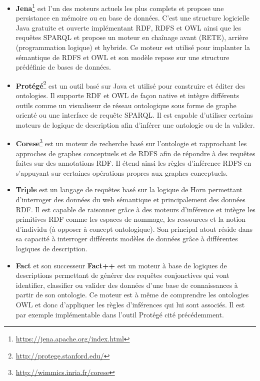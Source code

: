 \begin{itemize}
	\item \textbf{Jena}\footnote{\url{https://jena.apache.org/index.html}} \cite{jena2007semantic} est l’un des moteurs actuels les plus complets et propose une persistance en mémoire ou en base de données. C'est une structure logicielle Java gratuite et ouverte implémentant RDF, RDFS et OWL ainsi que les requêtes SPARQL et propose un moteur en chaînage avant (RETE), arrière (programmation logique) et hybride. Ce moteur est utilisé pour implanter la sémantique de RDFS et OWL et son modèle repose sur une structure prédéfinie de bases de données.
	\item \textbf{Protégé}\footnote{\url{http://protege.stanford.edu/}} \cite{noy2001creating} est un outil basé sur Java et utilisé pour construire et éditer des ontologies. Il supporte RDF et OWL de façon native et intègre différents outils comme un visualiseur de réseau ontologique sous forme de graphe orienté ou une interface de requête SPARQL. Il est capable d'utiliser certains moteurs de logique de description afin d'inférer une ontologie ou de la valider.
	\item \textbf{Corese}\footnote{\url{http://wimmics.inria.fr/corese}} \cite{corby2006searching} est un moteur de recherche basé sur l'ontologie et rapprochant les approches de graphes conceptuels et de RDFS afin de répondre à des requêtes faites sur des annotations RDF. Il étend ainsi les règles d'inférence RDFS en s'appuyant sur certaines opérations propres aux graphes conceptuels.
	\item \textbf{Triple} \cite{sintek2002triple} est un langage de requêtes basé sur la logique de Horn permettant d'interroger des données du web sémantique et principalement des données RDF. Il est capable de raisonner grâce à des moteurs d'inférence et intègre les primitives RDF comme les espaces de nommage, les ressources et la notion d'individu (à opposer à concept ontologique). Son principal atout réside dans sa capacité à interroger différents modèles de données grâce à différentes logiques de description.
	\item \textbf{Fact} et son successeur \textbf{Fact++} \cite{tsarkov2006fact++} est un moteur à base de logiques de descriptions permettant de générer des requêtes conjonctives qui vont identifier, classifier ou valider des données d'une base de connaissances à partir de son ontologie. Ce moteur est à même de comprendre les ontologies OWL et donc d'appliquer les règles d'inférences qui lui sont associés. Il est par exemple implémentable dans l'outil Protégé cité précédemment.
\end{itemize}


